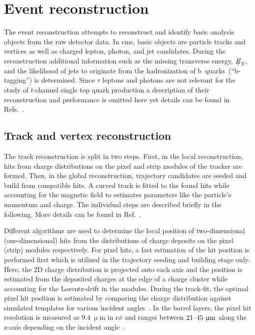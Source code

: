 \chapter{Event reconstruction}


The event reconstruction attempts to reconstruct and identify basic analysis objects from the raw detector data. In \gls{cms}, basic objects are particle tracks and vertices as well as charged lepton, photon, and jet candidates. During the reconstruction additional information such as the missing transverse energy, ${E\!\!\!/}_{\mathrm{T}}$, and the likelihood of jets to originate from the hadronization of b~quarks~(``b-tagging'') is determined. Since $\tau$ leptons and photons are not relevant for the study of $t$-channel single top quark production a description of their reconstruction and performance is omitted here yet details can be found in Refs.~\cite{Khachatryan:2015iwa,Khachatryan:2015dfa}.


\section{Track and vertex reconstruction}

The track reconstruction is split in two steps. First, in the local reconstruction, hits from charge distributions on the pixel and strip modules of the tracker are formed. Then, in the global reconstruction, trajectory candidates are seeded and build from compatible hits. A curved track is fitted to the found hits while accounting for the magnetic field to estimates parameters like the particle's momentum and charge. The individual steps are described briefly in the following. More details can be found in Ref.~\cite{Chatrchyan:2014fea}.

Different algorithms are used to determine the local position of two-dimensional (one-dimensional) hits from the distributions of charge deposits on the pixel (strip) modules respectively. For pixel hits, a fast estimation of the hit position is performed first which is utilized in the trajectory seeding and building stage only. Here, the 2D charge distribution is projected onto each axis and the position is estimated from the deposited charges at the edge of a charge cluster while accounting for the Lorentz-drift in the modules. During the track-fit, the optimal pixel hit position is estimated by comparing the charge distribution against simulated templates for various incident angles~\cite{Swartz:2007zz}. In the barrel layers, the pixel hit resolution is measured as $9.4~\upmu\mathrm{m}$ in $\mathrm{r}\phi$ and ranges between $21\text{--}45~\upmu\mathrm{m}$ along the z-axis depending on the incident angle~\cite{Chatrchyan:2014fea}. 

